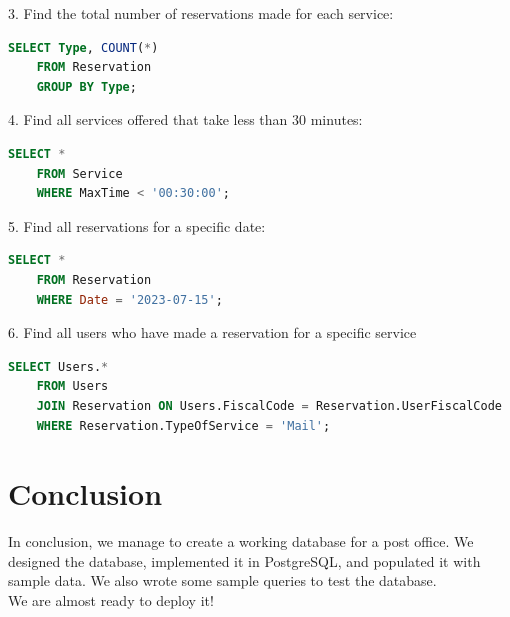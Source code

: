 \documentclass{article}
\begin{document}
3. Find the total number of reservations made for each service:

\begin{lstlisting}[language=SQL]
    SELECT Type, COUNT(*)
    FROM Reservation
    GROUP BY Type;
\end{lstlisting}

4. Find all services offered that take less than 30 minutes:

\begin{lstlisting}[language=SQL]
    SELECT *
    FROM Service
    WHERE MaxTime < '00:30:00';
\end{lstlisting}

5. Find all reservations for a specific date:

\begin{lstlisting}[language=SQL]
    SELECT *
    FROM Reservation
    WHERE Date = '2023-07-15';
\end{lstlisting}

6. Find all users who have made a reservation for a specific service

\begin{lstlisting}[language=SQL]
    SELECT Users.* 
    FROM Users 
    JOIN Reservation ON Users.FiscalCode = Reservation.UserFiscalCode 
    WHERE Reservation.TypeOfService = 'Mail';
\end{lstlisting}

\section{Conclusion}
In conclusion, we manage to create a working database for a post office. We designed the database, implemented it in PostgreSQL, and populated it with sample data. We also wrote some sample queries to test the database. \\
We are almost ready to deploy it!
\end{document}
